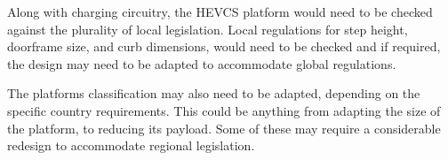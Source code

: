 \documentclass [12pt]{article}
\begin{document}
Along with charging circuitry, the HEVCS platform would need to be checked against the plurality of local legislation.
Local regulations for step height, doorframe size, and curb dimensions, would need to be checked and if required, the design may need to be adapted to accommodate global regulations.


The platforms classification may also need to be adapted, depending on the specific country requirements.
This could be anything from adapting the size of the platform, to reducing its payload.
Some of these may require a considerable redesign to accommodate regional legislation.
\newpage


\end{document}
